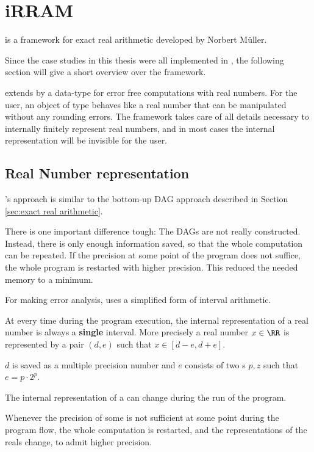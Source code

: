 \section{iRRAM}
	\irram is a \cc framework for exact real arithmetic developed by Norbert M\"uller.

	Since the case studies in this thesis were all implemented  in \irram, the
  following section will give a short overview over the \irram framework.

	\irram extends \cc by a data-type \real for error free computations with real numbers.
  For the user, an object of type \real behaves like a real number that can be
  manipulated without any rounding errors.
  The framework takes care of all details necessary to internally  finitely represent real
  numbers, and in most cases the internal representation will be invisible for
  the user.
	\subsection{Real Number representation}
		\irram's approach is similar to the bottom-up DAG approach described in
    Section \ref{sec:exact real arithmetic}.

		There is one important difference tough: The DAGs are not really
    constructed.
		Instead, there is only enough information saved, so that the whole
    computation can be repeated.
    If the precision at some point of the program does not suffice, the whole
    program is restarted with higher precision. 
    This reduced the needed memory to a minimum.

    For making error analysis, \irram uses a simplified form of interval
    arithmetic.

		At every time during the program execution, the internal representation of
    a real number is always a \textbf{single} interval. 
    More precisely a real number $x \in \RR$ is represented by a pair $(d,e)$ such that $x \in [d-e, d+e]$.

 		$d$ is saved as a multiple precision number and $e$ consists of two s $p,z$ such that $e = p \cdot 2^p$.

    The internal representation of a \real can change during the run of the
    program.
 		
 	  Whenever the precision of some \real is not sufficient at some point during
    the program flow, the whole computation is restarted, and the
    representations of the reals change, to admit higher precision.

